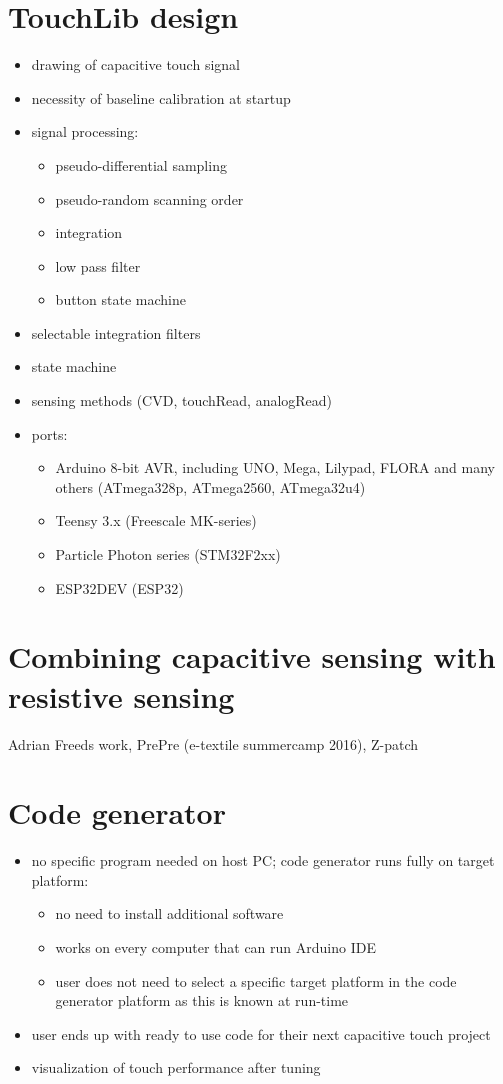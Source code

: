 \documentclass[format=sigchi, screen=true, review=true]{acmart}
\begin{document}
\section{TouchLib design}
\begin{itemize}
\item drawing of capacitive touch signal
\item necessity of baseline calibration at startup
\item signal processing:
	\begin{itemize}
	\item pseudo-differential sampling
	\item pseudo-random scanning order
	\item integration
	\item low pass filter
	\item button state machine
	\end{itemize}
\item selectable integration filters
\item state machine
\item sensing methods (CVD, touchRead, analogRead)
\item ports:
	\begin{itemize}
	\item Arduino 8-bit AVR, including UNO, Mega, Lilypad, FLORA and many others (ATmega328p, ATmega2560, ATmega32u4)
	\item Teensy 3.x (Freescale MK-series)
	\item Particle Photon series (STM32F2xx)
	\item ESP32DEV (ESP32)
	\end{itemize}
\end{itemize}

\section{Combining capacitive sensing with resistive sensing}
Adrian Freeds work, PrePre (e-textile summercamp 2016), Z-patch

\section{Code generator}
\begin{itemize}
\item no specific program needed on host PC; code generator runs fully on target platform:
	\begin{itemize}
	\item no need to install additional software
	\item works on every computer that can run Arduino IDE
	\item user does not need to select a specific target platform in the code generator platform as this is known at run-time
	\end{itemize}
\item user ends up with ready to use code for their next capacitive touch project
\item visualization of touch performance after tuning
\end{itemize}
\end{document}
